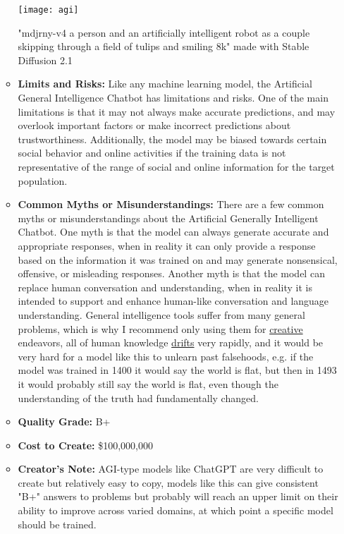 \begin{itemize}
\begin{itemize}
\begin{marginfigure}[-5.5cm]
        \texttt{[image: agi]}
        \caption{"mdjrny-v4 a person and an artificially intelligent robot as a couple skipping through a field of tulips and smiling 8k" made with Stable Diffusion 2.1}
\end{marginfigure}
    \item \textbf{Limits and Risks:} Like any machine learning model, the Artificial General Intelligence Chatbot has limitations and risks. One of the main limitations is that it may not always make accurate predictions, and may overlook important factors or make incorrect predictions about trustworthiness. Additionally, the model may be biased towards certain social behavior and online activities if the training data is not representative of the range of social and online information for the target population.
    \item \textbf{Common Myths or Misunderstandings:} There are a few common myths or misunderstandings about the Artificial Generally Intelligent Chatbot. One myth is that the model can always generate accurate and appropriate responses, when in reality it can only provide a response based on the information it was trained on and may generate nonsensical, offensive, or misleading responses. Another myth is that the model can replace human conversation and understanding, when in reality it is intended to support and enhance human-like conversation and language understanding. General intelligence tools suffer from many general problems, which is why I recommend only using them for \hyperref[sec:creative]{creative} endeavors, all of human knowledge \hyperref[sec:drift]{drifts} very rapidly, and it would be very hard for a model like this to unlearn past falsehoods, e.g. if the model was trained in 1400 it would say the world is flat, but then in 1493 it would probably still say the world is flat, even though the understanding of the truth had fundamentally changed. 
    \item \textbf{Quality Grade:} B+
    \item \textbf{Cost to Create:} \$100,000,000
    \item \textbf{Creator's Note:} AGI-type models like ChatGPT are very difficult to create but relatively easy to copy, models like this can give consistent "B+" answers to problems but probably will reach an upper limit on their ability to improve across varied domains, at which point a specific model should be trained.
\end{itemize}


\end{itemize}
